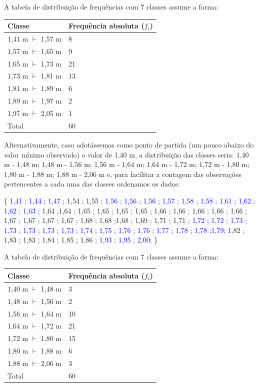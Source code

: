 \documentclass[
]{book}
\begin{document}
\hfill\break

A tabela de distribuição de frequências com 7 classes assume a forma:

\hfill\break

\begin{longtable}[]{@{}ll@{}}
\toprule()
Classe & Frequência absoluta (\(f_{i}\)) \\
\midrule()
\endhead
1,41 m \(\vdash\) 1,57 m & 8 \\
1,57 m \(\vdash\) 1,65 m & 9 \\
1,65 m \(\vdash\) 1,73 m & 21 \\
1,73 m \(\vdash\) 1,81 m & 13 \\
1,81 m \(\vdash\) 1,89 m & 6 \\
1,89 m \(\vdash\) 1,97 m & 2 \\
1,97 m \(\vdash\) 2,05 m & 1 \\
Total & 60 \\
\bottomrule()
\end{longtable}

\hfill\break

Alternativamente, caso adotássemos como ponto de partida (um pouco abaixo do valor mínimo observado) o valor de 1,40 m, a distribuição das classes seria: 1,40 m - 1,48 m; 1,48 m - 1,56 m; 1,56 m - 1,64 m; 1,64 m - 1,72 m; 1,72 m - 1,80 m; 1,80 m - 1,88 m; 1,88 m - 2,06 m e, para facilitar a contagem das observações pertencentes a cada uma das classes ordenamos os dados:

\hfill\break

\{
\textcolor{blue}{1,41 ; 1,44 ; 1,47 ;}
1,54 ; 1,55 ;
\textcolor{blue}{1,56 ; 1,56 ; 1,56 ; 1,57 ; 1,58 ; 1,58 ; 1,61 ; 1,62 ; 1,62 ; 1,63 ;}
1,64 ;1,64 ; 1,65 ; 1,65 ; 1,65 ; 1,65 ; 1,66 ; 1,66 ; 1,66 ; 1,66 ; 1,66 ; 1,67 ; 1,67 ; 1,67 ; 1,67 ; 1,68 ; 1,68 ;1,68 ; 1,69 ; 1,71 ; 1,71 ;
\textcolor{blue}{1,72 ; 1,72 ; 1,73 ; 1,73 ; 1,73 ; 1,73 ; 1,73 ; 1,74 ; 1,75 ; 1,76 ; 1,76 ; 1,77 ;  1,78 ; 1,78 ;1,79;} 1,82 ; 1,83 ; 1,83 ; 1,84 ; 1,85 ; 1,86 ;
\textcolor{blue}{1,93 ; 1,95 ; 2,00;} \}

\hfill\break

A tabela de distribuição de frequências com 7 classes assume a forma:

\hfill\break

\begin{longtable}[]{@{}ll@{}}
\toprule()
Classe & Frequência absoluta (\(f_{i}\)) \\
\midrule()
\endhead
1,40 m \(\vdash\) 1,48 m & 3 \\
1,48 m \(\vdash\) 1,56 m & 2 \\
1,56 m \(\vdash\) 1,64 m & 10 \\
1,64 m \(\vdash\) 1,72 m & 21 \\
1,72 m \(\vdash\) 1,80 m & 15 \\
1,80 m \(\vdash\) 1,88 m & 6 \\
1,88 m \(\vdash\) 2,06 m & 3 \\
Total & 60 \\
\bottomrule()
\end{longtable}
\end{document}
